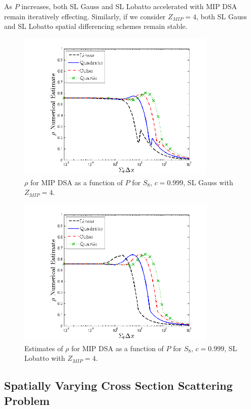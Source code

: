 As $P$ increases, both SL Gauss and SL Lobatto accelerated with MIP DSA remain iteratively effecting.  Similarly, if we consider $Z_{MIP}=4$, both SL Gauss and SL Lobatto spatial differencing schemes remain stable.
%
%
%
%
\begin{figure}[!htp]
\centering
\includegraphics[width=9.5cm]{chapter4_acceleration/Const_4_Constant_XS_SN8_MIP_Gauss.png}
\caption{$\rho$ for MIP DSA as a function of $P$ for  $S_8$, $c=0.999$, SL Gauss with $Z_{MIP}=4$.}
\label{fig:mip_gauss_z4}
\end{figure}
%
\vfill{}
%
\begin{figure}[!htp]
\centering
\includegraphics[width=9.5cm]{chapter4_acceleration/Const_4_Constant_XS_SN8_MIP_Lobatto.png}
\caption{Estimates of $\rho$ for MIP DSA as a function of $P$ for $S_8$, $c=0.999$,  SL Lobatto with $Z_{MIP}=4$.}
\label{fig:mip_lobatto_z4}
\end{figure}



\subsection{Spatially Varying Cross Section Scattering Problem}
\label{sec:chap4_variable_xs}

